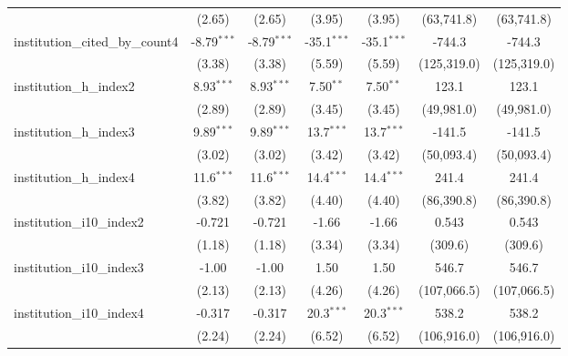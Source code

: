 \begin{tabular}{lcccccc}
                                         & (2.65)        & (2.65)        & (3.95)        & (3.95)        & (63,741.8)  & (63,741.8)\\   
   institution\_cited\_by\_count4        & -8.79$^{***}$ & -8.79$^{***}$ & -35.1$^{***}$ & -35.1$^{***}$ & -744.3      & -744.3\\   
                                         & (3.38)        & (3.38)        & (5.59)        & (5.59)        & (125,319.0) & (125,319.0)\\   
   institution\_h\_index2                & 8.93$^{***}$  & 8.93$^{***}$  & 7.50$^{**}$   & 7.50$^{**}$   & 123.1       & 123.1\\   
                                         & (2.89)        & (2.89)        & (3.45)        & (3.45)        & (49,981.0)  & (49,981.0)\\   
   institution\_h\_index3                & 9.89$^{***}$  & 9.89$^{***}$  & 13.7$^{***}$  & 13.7$^{***}$  & -141.5      & -141.5\\   
                                         & (3.02)        & (3.02)        & (3.42)        & (3.42)        & (50,093.4)  & (50,093.4)\\   
   institution\_h\_index4                & 11.6$^{***}$  & 11.6$^{***}$  & 14.4$^{***}$  & 14.4$^{***}$  & 241.4       & 241.4\\   
                                         & (3.82)        & (3.82)        & (4.40)        & (4.40)        & (86,390.8)  & (86,390.8)\\   
   institution\_i10\_index2              & -0.721        & -0.721        & -1.66         & -1.66         & 0.543       & 0.543\\   
                                         & (1.18)        & (1.18)        & (3.34)        & (3.34)        & (309.6)     & (309.6)\\   
   institution\_i10\_index3              & -1.00         & -1.00         & 1.50          & 1.50          & 546.7       & 546.7\\   
                                         & (2.13)        & (2.13)        & (4.26)        & (4.26)        & (107,066.5) & (107,066.5)\\   
   institution\_i10\_index4              & -0.317        & -0.317        & 20.3$^{***}$  & 20.3$^{***}$  & 538.2       & 538.2\\   
                                         & (2.24)        & (2.24)        & (6.52)        & (6.52)        & (106,916.0) & (106,916.0)\\   

\end{tabular}

